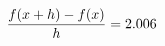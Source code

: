\documentclass[preview]{standalone}
\begin{document}
\begin{align*}
\special{dvisvgm:raw <g id='unique000'>}\frac{f(x+h)-f(x)}{h} = 2.006\special{dvisvgm:raw </g>}
\end{align*}
\end{document}
